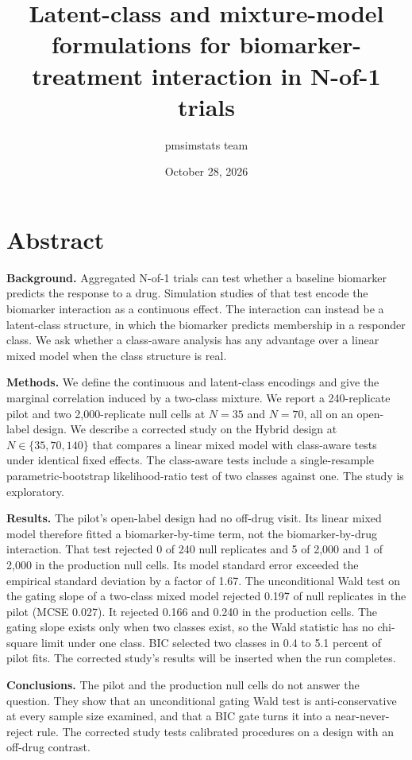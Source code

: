 \documentclass[
  11pt,
]{article}
\title{Latent-class and mixture-model formulations for biomarker-treatment interaction in N-of-1 trials}
\author{pmsimstats team}
\date{October 28, 2026}
\begin{document}
\maketitle

{
\setcounter{tocdepth}{2}
\tableofcontents
}
\listoffigures
\listoftables
{}
\section*{Abstract}\label{abstract}

\textbf{Background.} Aggregated N-of-1 trials can test whether a baseline
biomarker predicts the response to a drug. Simulation studies of that
test encode the biomarker interaction as a continuous effect. The
interaction can instead be a latent-class structure, in which the
biomarker predicts membership in a responder class. We ask whether a
class-aware analysis has any advantage over a linear mixed model when
the class structure is real.

\textbf{Methods.} We define the continuous and latent-class encodings and
give the marginal correlation induced by a two-class mixture. We
report a 240-replicate pilot and two 2,000-replicate null cells at
\(N = 35\) and \(N = 70\), all on an open-label design. We describe a
corrected study on the Hybrid design at \(N \in \{35, 70, 140\}\) that
compares a linear mixed model with class-aware tests under identical
fixed effects. The class-aware tests include a single-resample
parametric-bootstrap likelihood-ratio test of two classes against
one. The study is exploratory.

\textbf{Results.} The pilot's open-label design had no off-drug visit. Its
linear mixed model therefore fitted a biomarker-by-time term, not the
biomarker-by-drug interaction. That test rejected 0 of 240 null
replicates and 5 of 2,000 and
1 of 2,000 in the production null cells.
Its model standard error exceeded the empirical standard deviation by
a factor of 1.67. The
unconditional Wald test on the gating slope of a two-class mixed model
rejected 0.197 of null replicates in the
pilot (MCSE 0.027).
It rejected 0.166 and
0.240 in the production cells. The
gating slope exists only when two classes exist, so the Wald statistic
has no chi-square limit under one class. BIC selected two classes in
0.4 to
5.1 percent of pilot fits. The
corrected study's results will be inserted when the run completes.

\textbf{Conclusions.} The pilot and the production null cells do not answer
the question. They show that an unconditional gating Wald test is
anti-conservative at every sample size examined, and that a BIC gate
turns it into a near-never-reject rule. The corrected study tests
calibrated procedures on a design with an off-drug contrast.
\end{document}
